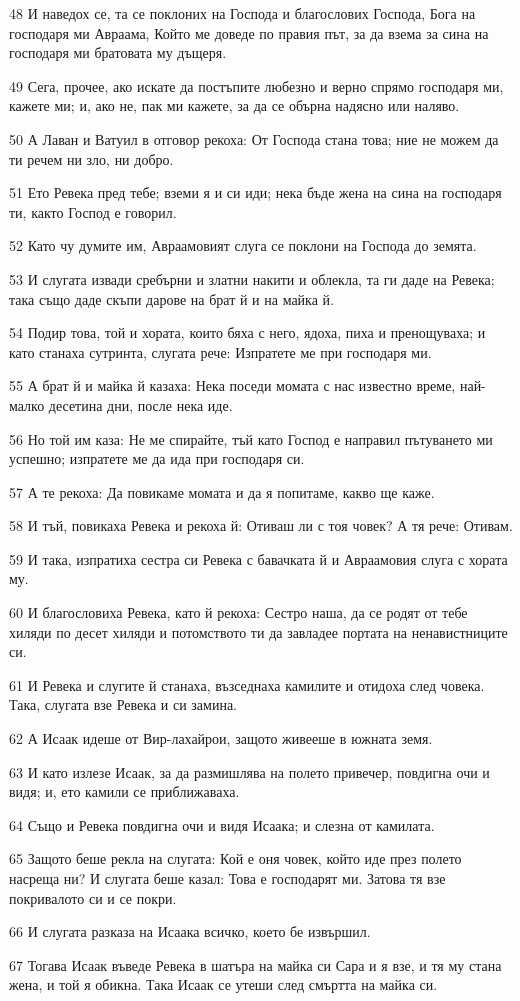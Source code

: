 \par 48 И наведох се, та се поклоних на Господа и благослових Господа, Бога на господаря ми Авраама, Който ме доведе по правия път, за да взема за сина на господаря ми братовата му дъщеря.
\par 49 Сега, прочее, ако искате да постъпите любезно и верно спрямо господаря ми, кажете ми; и, ако не, пак ми кажете, за да се обърна надясно или наляво.
\par 50 А Лаван и Ватуил в отговор рекоха: От Господа стана това; ние не можем да ти речем ни зло, ни добро.
\par 51 Ето Ревека пред тебе; вземи я и си иди; нека бъде жена на сина на господаря ти, както Господ е говорил.
\par 52 Като чу думите им, Авраамовият слуга се поклони на Господа до земята.
\par 53 И слугата извади сребърни и златни накити и облекла, та ги даде на Ревека; така също даде скъпи дарове на брат й и на майка й.
\par 54 Подир това, той и хората, които бяха с него, ядоха, пиха и пренощуваха; и като станаха сутринта, слугата рече: Изпратете ме при господаря ми.
\par 55 А брат й и майка й казаха: Нека поседи момата с нас известно време, най-малко десетина дни, после нека иде.
\par 56 Но той им каза: Не ме спирайте, тъй като Господ е направил пътуването ми успешно; изпратете ме да ида при господаря си.
\par 57 А те рекоха: Да повикаме момата и да я попитаме, какво ще каже.
\par 58 И тъй, повикаха Ревека и рекоха й: Отиваш ли с тоя човек? А тя рече: Отивам.
\par 59 И така, изпратиха сестра си Ревека с бавачката й и Авраамовия слуга с хората му.
\par 60 И благословиха Ревека, като й рекоха: Сестро наша, да се родят от тебе хиляди по десет хиляди и потомството ти да завладее портата на ненавистниците си.
\par 61 И Ревека и слугите й станаха, възседнаха камилите и отидоха след човека. Така, слугата взе Ревека и си замина.
\par 62 А Исаак идеше от Вир-лахайрои, защото живееше в южната земя.
\par 63 И като излезе Исаак, за да размишлява на полето привечер, повдигна очи и видя; и, ето камили се приближаваха.
\par 64 Също и Ревека повдигна очи и видя Исаака; и слезна от камилата.
\par 65 Защото беше рекла на слугата: Кой е оня човек, който иде през полето насреща ни? И слугата беше казал: Това е господарят ми. Затова тя взе покривалото си и се покри.
\par 66 И слугата разказа на Исаака всичко, което бе извършил.
\par 67 Тогава Исаак въведе Ревека в шатъра на майка си Сара и я взе, и тя му стана жена, и той я обикна. Така Исаак се утеши след смъртта на майка си.

